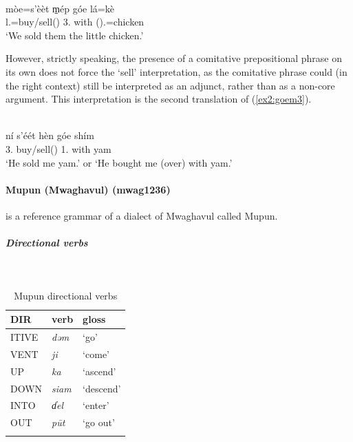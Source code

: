 \ea\label{ex2:goem2}
 \\
\gll mòe=s'èèt m̠ép góe lá=kè \\
l.=buy/sell() 3. with ().=chicken \\
\glt `We sold them the little chicken.'
\z 

However, strictly speaking, the presence of a comitative prepositional phrase on its own does not force the `sell' interpretation, as the comitative phrase could (in the right context) still be interpreted as an adjunct, rather than as a non-core argument. This interpretation is the second translation of (\ref{ex2:goem3}).

\ea\label{ex2:goem3}
 \\
\gll  ní s'éét hèn góe shím \\
3. buy/sell() 1. with yam \\
\glt `He sold me yam.' or `He bought me (over) with yam.'
\z 

\paragraph*{Mupun (Mwaghavul) (mwag1236)} \label{mupu}

\citet{frajzyngierGrammarMupun1993} is a reference grammar of a dialect of Mwaghavul called Mupun.

\newpage
\subparagraph{Directional verbs}~



\begin{table}[H]
	\caption{Mupun directional verbs} 
	\label{tab:mupuV}
	\begin{tabular}{lll} %
		\lsptoprule
		DIR & verb & gloss   \\ %
		\midrule
		ITIVE & \textit{dəm} & `go' \\
		VENT & \textit{ji} & `come' \\
		UP & \textit{ka} & `ascend' \\
		DOWN & \textit{siam} & `descend' \\
		INTO& \textit{ɗel} & `enter' \\
		OUT & \textit{pūt} & `go out' \\
		\lspbottomrule
	\end{tabular}
\end{table}


